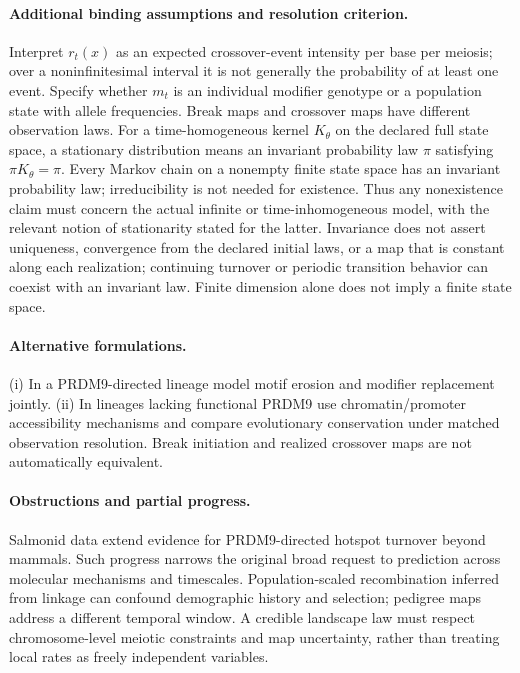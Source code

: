 \documentclass[11pt]{article}
\begin{document}
\paragraph{Additional binding assumptions and resolution criterion.} Interpret $r_t(x)$ as an expected crossover-event intensity per base per meiosis; over a noninfinitesimal interval it is not generally the probability of at least one event. Specify whether $m_t$ is an individual modifier genotype or a population state with allele frequencies. Break maps and crossover maps have different observation laws. For a time-homogeneous kernel $K_\theta$ on the declared full state space, a stationary distribution means an invariant probability law $\pi$ satisfying $\pi K_\theta=\pi$. Every Markov chain on a nonempty finite state space has an invariant probability law; irreducibility is not needed for existence. Thus any nonexistence claim must concern the actual infinite or time-inhomogeneous model, with the relevant notion of stationarity stated for the latter. Invariance does not assert uniqueness, convergence from the declared initial laws, or a map that is constant along each realization; continuing turnover or periodic transition behavior can coexist with an invariant law. Finite dimension alone does not imply a finite state space.

\paragraph{Alternative formulations.} (i) In a PRDM9-directed lineage model motif erosion and modifier replacement jointly. (ii) In lineages lacking functional PRDM9 use chromatin/promoter accessibility mechanisms and compare evolutionary conservation under matched observation resolution. Break initiation and realized crossover maps are not automatically equivalent.
\paragraph{Obstructions and partial progress.} Salmonid data extend evidence for PRDM9-directed hotspot turnover beyond mammals. Such progress narrows the original broad request to prediction across molecular mechanisms and timescales. Population-scaled recombination inferred from linkage can confound demographic history and selection; pedigree maps address a different temporal window. A credible landscape law must respect chromosome-level meiotic constraints and map uncertainty, rather than treating local rates as freely independent variables.
\end{document}

